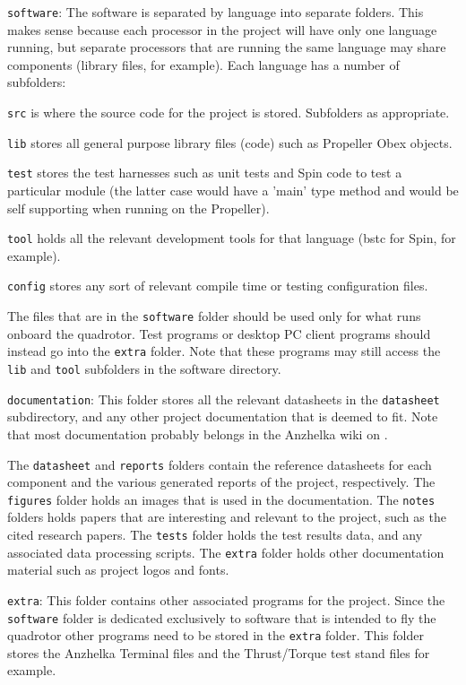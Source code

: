 \documentclass{article}
\numberwithin{equation}{section} %
\begin{document}
\texttt{software}:
The software is separated by language into separate folders. This makes sense because each processor in the project will have only one language running, but separate processors that are running the same language may share components (library files, for example). Each language has a number of subfolders: 

\begin{list}{*}{}
	\item \texttt{src} is where the source code for the project is stored. Subfolders as appropriate. 
	\item \texttt{lib} stores all general purpose library files (code) such as Propeller Obex objects. 
	\item \texttt{test} stores the test harnesses such as unit tests and Spin code to test a particular module (the latter case would have a 'main' type method and would be self supporting when running on the Propeller). 
	\item \texttt{tool} holds all the relevant development tools for that language (bstc for Spin, for example). 
	\item \texttt{config} stores any sort of relevant compile time or testing configuration files. 
\end{list}
The files that are in the \texttt{software} folder should be used only for what runs onboard the quadrotor. Test programs or desktop PC client programs should instead go into the \texttt{extra} folder. Note that these programs may still access the \texttt{lib} and \texttt{tool} subfolders in the software directory. 

\texttt{documentation}:
This folder stores all the relevant datasheets in the \texttt{datasheet} subdirectory, and any other project documentation that is deemed to fit. Note that most documentation probably belongs in the Anzhelka wiki on \cite{anzhelka_code}. 

The \texttt{datasheet} and \texttt{reports} folders contain the reference datasheets for each component and the various generated reports of the project, respectively. The \texttt{figures} folder holds an images that is used in the documentation. The \texttt{notes} folders holds papers that are interesting and relevant to the project, such as the cited research papers. The \texttt{tests} folder holds the test results data, and any associated data processing scripts. The \texttt{extra} folder holds other documentation material such as project logos and fonts. 

\texttt{extra}:
This folder contains other associated programs for the project. Since the \texttt{software} folder is dedicated exclusively to software that is intended to fly the quadrotor other programs need to be stored in the \texttt{extra} folder. This folder stores the Anzhelka Terminal files and the Thrust/Torque test stand files for example.
\end{document}
